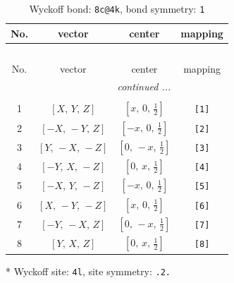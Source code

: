 \documentclass[fleqn,8pt]{jsarticle}
\begin{document}
\renewcommand{\arraystretch}{1.2}
\begin{longtable}{cccc}
\caption{Wyckoff bond: {\tt 8c@4k}, bond symmetry: {\tt 1}}
 \\
 \hline \hline
No. & vector & center & mapping \\ \hline \endfirsthead

\multicolumn{3}{l}{\tablename\ \thetable{}} \\
 \hline \hline
No. & vector & center & mapping \\ \hline \endhead

 \hline \hline
\multicolumn{3}{r}{\footnotesize\it continued ...} \\ \endfoot

 \hline \hline
\multicolumn{3}{r}{} \\ \endlastfoot

1 & $\left[ X,\, Y,\, Z \right]$ & $\left[ x,\, 0,\, \frac{1}{2} \right]$ & {\tt [1]} \\ \hline
2 & $\left[ - X,\, - Y,\, Z \right]$ & $\left[ - x,\, 0,\, \frac{1}{2} \right]$ & {\tt [2]} \\ \hline
3 & $\left[ Y,\, - X,\, - Z \right]$ & $\left[ 0,\, - x,\, \frac{1}{2} \right]$ & {\tt [3]} \\ \hline
4 & $\left[ - Y,\, X,\, - Z \right]$ & $\left[ 0,\, x,\, \frac{1}{2} \right]$ & {\tt [4]} \\ \hline
5 & $\left[ - X,\, Y,\, - Z \right]$ & $\left[ - x,\, 0,\, \frac{1}{2} \right]$ & {\tt [5]} \\ \hline
6 & $\left[ X,\, - Y,\, - Z \right]$ & $\left[ x,\, 0,\, \frac{1}{2} \right]$ & {\tt [6]} \\ \hline
7 & $\left[ - Y,\, - X,\, Z \right]$ & $\left[ 0,\, - x,\, \frac{1}{2} \right]$ & {\tt [7]} \\ \hline
8 & $\left[ Y,\, X,\, Z \right]$ & $\left[ 0,\, x,\, \frac{1}{2} \right]$ & {\tt [8]} \\
\end{longtable}
* Wyckoff site: {\tt 4l}, site symmetry: {\tt .2.}
\renewcommand{\arraystretch}{1.2}
\end{document}
